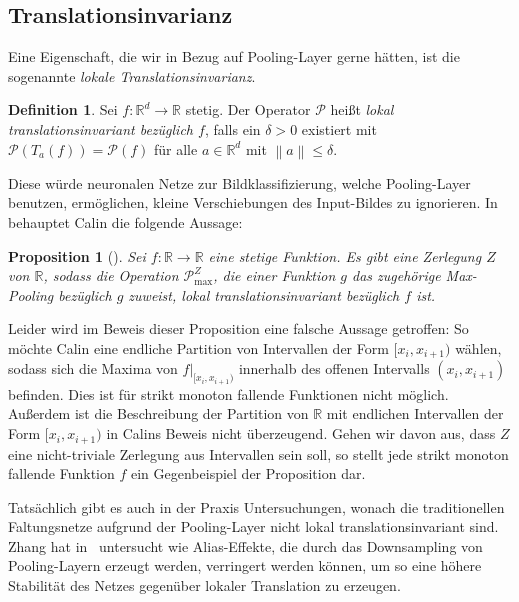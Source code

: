 \documentclass[paper=a4, 	%
		fontsize=11pt,
		abstract=true, 	%
		headsepline, 	%
		notitlepage	%
		]{scrartcl}
\newtheorem{proposition}[theorem]{Proposition}
\theoremstyle{definition}
\newtheorem{definition}[theorem]{Definition}
\newcommand{\R}{\mathbb{R}}
\newcommand{\norm}[1]{\left\lVert#1\right\rVert}
\begin{document}
\subsection{Translationsinvarianz}

Eine Eigenschaft, die wir in Bezug auf Pooling-Layer gerne hätten, ist die sogenannte \emph{lokale Translationsinvarianz}.
\begin{definition}
    Sei $f: \R^d \rightarrow \R$ stetig.
    Der Operator $\mathcal{P}$ heißt \emph{lokal translationsinvariant bezüglich $f$}, falls ein $\delta > 0$ existiert mit $\mathcal{P} ( T_a ( f ) ) = \mathcal{P} ( f )$ für alle $a\in\R^d$ mit $\norm{a} \leq \delta$.
\end{definition}

Diese würde neuronalen Netze zur Bildklassifizierung, welche Pooling-Layer benutzen, er\-mög\-lichen, kleine Verschiebungen des Input-Bildes zu ignorieren.
In~\cite[Proposition~15.2.1]{Calin2020} behauptet Calin die folgende Aussage:
\begin{proposition}[{\cite[Proposition~15.2.1]{Calin2020}}]
    Sei $f: \R \rightarrow \R$ eine stetige Funktion.
    Es gibt eine Zerlegung $Z$ von $\R$, sodass die Operation $\mathcal{P}^Z_{\max}$, die einer Funktion $g$ das zugehörige Max-Pooling bezüglich $g$ zuweist, lokal translationsinvariant bezüglich $f$ ist.
\end{proposition}

Leider wird im Beweis dieser Proposition eine falsche Aussage getroffen:
So möchte Calin eine endliche Partition von Intervallen der Form $[x_i, x_{i+1})$ wählen, sodass sich die Maxima von ${f}\vert_{[x_i, x_{i+1})}$ innerhalb des offenen Intervalls $(x_i, x_{i+1})$ befinden.
Dies ist für strikt monoton fallende Funktionen nicht möglich.
Außerdem ist die Beschreibung der Partition von $\R$  mit endlichen Intervallen der Form $[x_i, x_{i+1})$ in Calins Beweis nicht überzeugend.
Gehen wir davon aus, dass $Z$ eine nicht-triviale Zerlegung aus Intervallen sein soll, so stellt jede strikt monoton fallende Funktion $f$ ein Gegenbeispiel der Proposition dar.

Tatsächlich gibt es auch in der Praxis Untersuchungen, wonach die traditionellen Faltungsnetze aufgrund der Pooling-Layer nicht lokal translationsinvariant sind.
Zhang hat in~\cite{zhang2019shiftinvar} untersucht wie Alias-Effekte, die durch das Downsampling von Pooling-Layern erzeugt werden, verringert werden können, um so eine höhere Stabilität des Netzes gegenüber lokaler Translation zu erzeugen.
\end{document}
